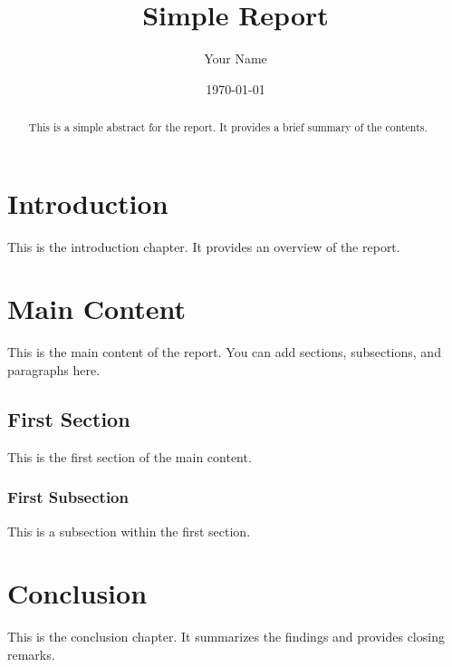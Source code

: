 \documentclass{report}
\title{Simple Report}
\author{Your Name}
\date{\today}
\begin{document}
\maketitle

\begin{abstract}
This is a simple abstract for the report. It provides a brief summary of the contents.
\end{abstract}

\tableofcontents

\chapter{Introduction}
This is the introduction chapter. It provides an overview of the report.

\chapter{Main Content}
This is the main content of the report. You can add sections, subsections, and paragraphs here.

\section{First Section}
This is the first section of the main content.

\subsection{First Subsection}
This is a subsection within the first section.

\chapter{Conclusion}
This is the conclusion chapter. It summarizes the findings and provides closing remarks.
\end{document}
